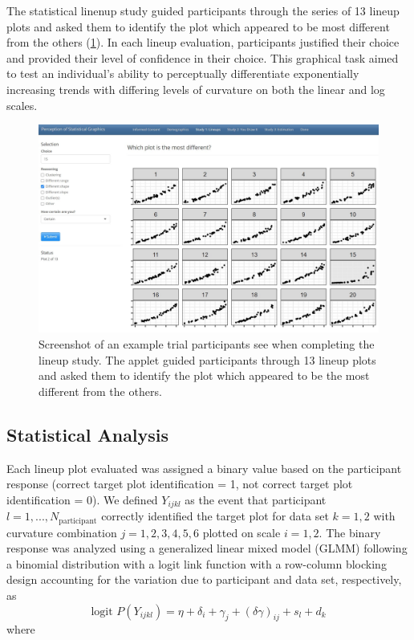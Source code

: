 \documentclass[12pt]{article}
\begin{document}
The statistical linenup study guided participants through the series of
13 lineup plots and asked them to identify the plot which appeared to be
most different from the others (\cref{fig:lineup-study-example-trial}).
In each lineup evaluation, participants justified their choice and
provided their level of confidence in their choice. This graphical task
aimed to test an individual's ability to perceptually differentiate
exponentially increasing trends with differing levels of curvature on
both the linear and log scales.

\begin{figure}[tbp]

{\centering \includegraphics[width=1\linewidth,]{images/lineup-study-example-trial} 

}

\caption[Lineup study example trial]{Screenshot of an example trial participants see when completing the lineup study. The applet guided participants through 13 lineup plots and asked them to identify the plot which appeared to be the most different from the others.}\label{fig:lineup-study-example-trial}
\end{figure}

\hypertarget{statistical-analysis}{%
\subsection{Statistical Analysis}\label{statistical-analysis}}

Each lineup plot evaluated was assigned a binary value based on the
participant response (correct target plot identification = 1, not
correct target plot identification = 0). We defined \(Y_{ijkl}\) as the
event that participant \(l = 1,...,N_\text{participant}\) correctly
identified the target plot for data set \(k = 1,2\) with curvature
combination \(j = 1,2,3,4,5,6\) plotted on scale \(i = 1,2\). The binary
response was analyzed using a generalized linear mixed model (GLMM)
following a binomial distribution with a logit link function with a
row-column blocking design accounting for the variation due to
participant and data set, respectively, as \begin{equation}
\text{logit }P(Y_{ijkl}) = \eta + \delta_i + \gamma_j + (\delta \gamma)_{ij} + s_l + d_k
\end{equation} \noindent where
\end{document}
